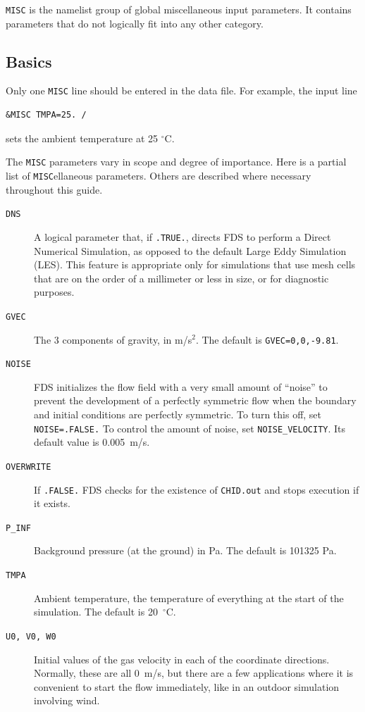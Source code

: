\documentclass[11pt]{book}
\newcommand{\ct}{\tt\small}
\begin{document}
{\ct MISC} is the namelist group of global miscellaneous input parameters. It contains parameters that do not logically fit into any other category.

\subsection{Basics}

\label{info:MISC_Basics}

Only one {\ct MISC} line should be entered in the data file. For example, the input line

\footnotesize
\begin{verbatim}
&MISC TMPA=25. /
\end{verbatim}
\normalsize

\noindent
sets the ambient temperature at 25 $^\circ$C.

The {\ct MISC} parameters vary in scope and degree of importance. Here is a partial list of {\ct MISC}ellaneous parameters. Others are described where necessary throughout this
guide.

\begin{description}
\item[{\ct DNS}] A logical parameter that, if {\ct .TRUE.}, directs FDS to perform a Direct Numerical Simulation,
as opposed to the default Large Eddy Simulation (LES). This feature is appropriate only for simulations that use mesh cells that are
on the order of a millimeter or less in size, or for diagnostic purposes.
\item[{\ct GVEC}] The 3 components of gravity, in m/s$^2$. The default is {\ct GVEC=0,0,-9.81}.
\item[{\ct NOISE}] FDS initializes the flow field with a very small amount of ``noise'' to prevent the
development of a perfectly symmetric flow when the boundary
and initial conditions are perfectly symmetric. To turn this off, set {\ct NOISE=.FALSE.} To control the amount of noise, set {\ct NOISE\_VELOCITY}. Its default value is 0.005~m/s.
\item[{\ct OVERWRITE}] If {\ct .FALSE.} FDS checks for the existence of  {\ct CHID.out} and stops execution if it exists.
\item[{\ct P\_INF}] Background pressure (at the ground) in Pa. The default is 101325 Pa.
\item[{\ct TMPA}] Ambient temperature, the temperature of everything at the start of the simulation. The default is 20~$^\circ$C.
\item[{\ct U0, V0, W0}] Initial values of the gas velocity in each of the coordinate directions. Normally, these are all 0~m/s, but there are a few applications where it is
convenient to start the flow immediately, like in an outdoor simulation involving wind.
\end{description}
\end{document}

